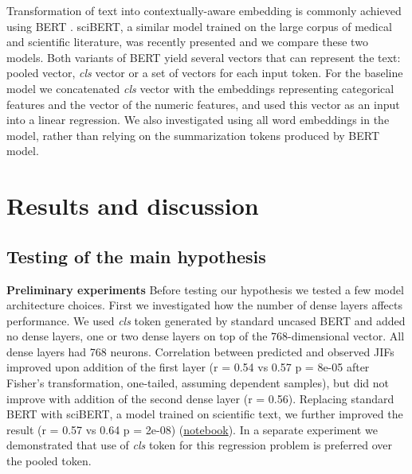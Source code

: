 \documentclass[11pt]{article}
\begin{document}
Transformation of text into contextually-aware embedding is commonly achieved using BERT \citep{DBLP:journals/corr/abs-1810-04805}. sciBERT, a similar model trained on the large corpus of medical and scientific literature, was recently presented \citep{DBLP:journals/corr/abs-1903-10676} and we compare these two models. Both variants of BERT yield several vectors that can represent the text: pooled vector, \textit{cls} vector or a set of vectors for each input token. For the baseline model we concatenated \textit{cls} vector with the embeddings representing categorical features and the vector of the numeric features, and used this vector as an input into a linear regression. We also investigated using all word embeddings in the model, rather than relying on the summarization tokens produced by BERT model.

\section{Results and discussion}
\subsection{Testing of the main hypothesis}
\textbf{Preliminary experiments} Before testing our hypothesis we tested a few model architecture choices. First we investigated how the number of dense layers affects performance. We used \textit{cls} token generated by standard uncased BERT and added no dense layers, one or two dense layers on top of the 768-dimensional vector. All dense layers had 768 neurons. Correlation between predicted and observed JIFs improved upon addition of the first layer (r = 0.54 vs 0.57 p = 8e-05 after Fisher's transformation, one-tailed, assuming dependent samples), but did not improve with addition of the second dense layer (r = 0.56). Replacing standard BERT with sciBERT, a model trained on scientific text, we further improved the result (r = 0.57 vs 0.64 p = 2e-08) (\href{https://github.com/ArtemChemist/w266_project/blob/main/Notebooks/Dense%20layers%20and%20BERT%20vs%20sciBERT.ipynb}{notebook}). In a separate experiment we demonstrated that use of \textit{cls} token for this regression problem is preferred over the pooled token.
\end{document}
